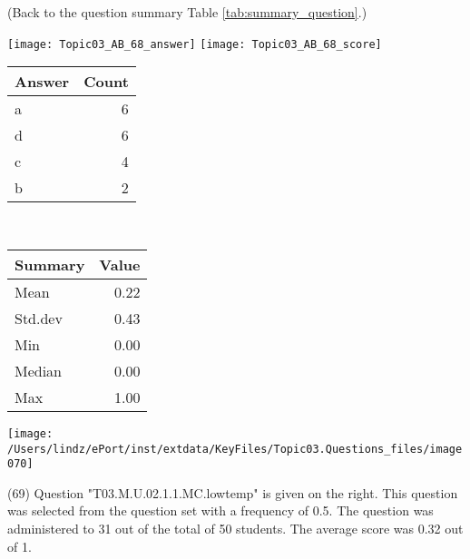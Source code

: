 \documentclass[12pt,english,nohyper]{tufte-handout}\usepackage[]{graphicx}\usepackage[]{color}
\begin{document}
 (Back to the question summary Table \ref{tab:summary_question}.)

\begin{center} \texttt{[image: Topic03\_AB\_68\_answer]} \texttt{[image: Topic03\_AB\_68\_score]} \end{center} 

\begin{center}%
\begin{tabular}{lr}
  \hline
Answer & Count \\ 
  \hline
a &   6 \\ 
  d &   6 \\ 
  c &   4 \\ 
  b &   2 \\ 
   \hline
\end{tabular}
~~~~~~~~%
\begin{tabular}{lr}
  \hline
Summary & Value \\ 
  \hline
Mean & 0.22 \\ 
  Std.dev & 0.43 \\ 
  Min & 0.00 \\ 
  Median & 0.00 \\ 
  Max & 1.00 \\ 
   \hline
\end{tabular}
\end{center}\newpage{}



\vspace{4cm}\begin{marginfigure}\texttt{[image: /Users/lindz/ePort/inst/extdata/KeyFiles/Topic03.Questions\_files/image070]}\end{marginfigure}\vspace{-4cm} (69) Question "T03.M.U.02.1.1.MC.lowtemp" is given on the right. This question was selected from the question set with a frequency of 0.5. The question was administered to 31 out of the total of 50 students. The average score was 0.32 out of 1.
\end{document}
